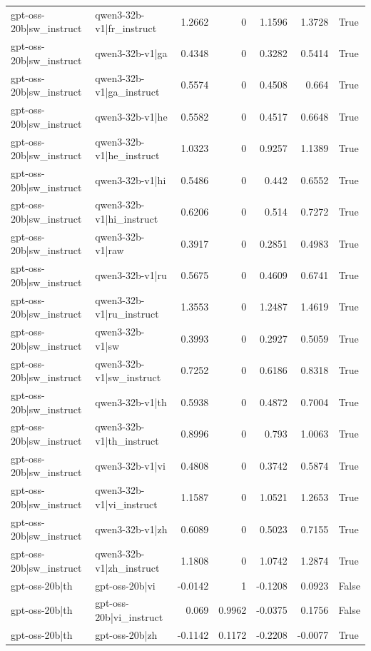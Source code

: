 \begin{table}
\begin{tabular}{l l r r r r l}
gpt-oss-20b|sw_instruct & qwen3-32b-v1|fr_instruct & 1.2662 & 0 & 1.1596 & 1.3728 & True \\
gpt-oss-20b|sw_instruct & qwen3-32b-v1|ga & 0.4348 & 0 & 0.3282 & 0.5414 & True \\
gpt-oss-20b|sw_instruct & qwen3-32b-v1|ga_instruct & 0.5574 & 0 & 0.4508 & 0.664 & True \\
gpt-oss-20b|sw_instruct & qwen3-32b-v1|he & 0.5582 & 0 & 0.4517 & 0.6648 & True \\
gpt-oss-20b|sw_instruct & qwen3-32b-v1|he_instruct & 1.0323 & 0 & 0.9257 & 1.1389 & True \\
gpt-oss-20b|sw_instruct & qwen3-32b-v1|hi & 0.5486 & 0 & 0.442 & 0.6552 & True \\
gpt-oss-20b|sw_instruct & qwen3-32b-v1|hi_instruct & 0.6206 & 0 & 0.514 & 0.7272 & True \\
gpt-oss-20b|sw_instruct & qwen3-32b-v1|raw & 0.3917 & 0 & 0.2851 & 0.4983 & True \\
gpt-oss-20b|sw_instruct & qwen3-32b-v1|ru & 0.5675 & 0 & 0.4609 & 0.6741 & True \\
gpt-oss-20b|sw_instruct & qwen3-32b-v1|ru_instruct & 1.3553 & 0 & 1.2487 & 1.4619 & True \\
gpt-oss-20b|sw_instruct & qwen3-32b-v1|sw & 0.3993 & 0 & 0.2927 & 0.5059 & True \\
gpt-oss-20b|sw_instruct & qwen3-32b-v1|sw_instruct & 0.7252 & 0 & 0.6186 & 0.8318 & True \\
gpt-oss-20b|sw_instruct & qwen3-32b-v1|th & 0.5938 & 0 & 0.4872 & 0.7004 & True \\
gpt-oss-20b|sw_instruct & qwen3-32b-v1|th_instruct & 0.8996 & 0 & 0.793 & 1.0063 & True \\
gpt-oss-20b|sw_instruct & qwen3-32b-v1|vi & 0.4808 & 0 & 0.3742 & 0.5874 & True \\
gpt-oss-20b|sw_instruct & qwen3-32b-v1|vi_instruct & 1.1587 & 0 & 1.0521 & 1.2653 & True \\
gpt-oss-20b|sw_instruct & qwen3-32b-v1|zh & 0.6089 & 0 & 0.5023 & 0.7155 & True \\
gpt-oss-20b|sw_instruct & qwen3-32b-v1|zh_instruct & 1.1808 & 0 & 1.0742 & 1.2874 & True \\
gpt-oss-20b|th & gpt-oss-20b|vi & -0.0142 & 1 & -0.1208 & 0.0923 & False \\
gpt-oss-20b|th & gpt-oss-20b|vi_instruct & 0.069 & 0.9962 & -0.0375 & 0.1756 & False \\
gpt-oss-20b|th & gpt-oss-20b|zh & -0.1142 & 0.1172 & -0.2208 & -0.0077 & True \\

\end{tabular}
\end{table}
